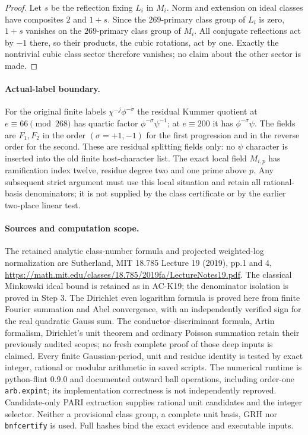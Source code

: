 \begin{proof}
Let $s$ be the reflection fixing $L_i$ in $M_i$.
Norm and extension on ideal classes have composites $2$ and $1+s$.
Since the $269$-primary class group of $L_i$ is zero, $1+s$ vanishes
on the $269$-primary class group of $M_i$.
All conjugate reflections act by $-1$ there, so their products,
the cubic rotations, act by one.
Exactly the nontrivial cubic class sector therefore vanishes;
no claim about the other sector is made.
\end{proof}

\paragraph{Actual-label boundary.}
For the original finite labels $\chi^{-j}\phi^{-\sigma}$ the residual
Kummer quotient at $e\equiv66\pmod{268}$ has quartic factor
$\phi^{-\sigma}\psi^{-1}$; at $e\equiv200$ it has
$\phi^{-\sigma}\psi$.
The fields are $F_1,F_2$ in the order $(\sigma=+1,-1)$ for the
first progression and in the reverse order for the second.
These are residual splitting fields only: no $\psi$ character is
inserted into the old finite host-character list.
The exact local field $M_{i,p}$ has ramification index twelve,
residue degree two and one prime above $p$.
Any subsequent strict argument must use this local situation and
retain all rational-basis denominators; it is not supplied by the
class certificate or by the earlier two-place linear test.

\paragraph{Sources and computation scope.}
The retained analytic class-number formula and projected weighted-log
normalization are Sutherland, MIT 18.785 Lecture 19 (2019), pp.1 and 4,
\url{https://math.mit.edu/classes/18.785/2019fa/LectureNotes19.pdf}.
The classical Minkowski ideal bound is retained as in AC-K19;
the denominator isolation is proved in Step 3.
The Dirichlet even logarithm formula is proved here from finite
Fourier summation and Abel convergence, with an independently
verified sign for the real quadratic Gauss sum.
The conductor--discriminant formula, Artin formalism, Dirichlet's
unit theorem and ordinary Poisson summation retain their previously
audited scopes; no fresh complete proof of those deep inputs is claimed.
Every finite Gaussian-period, unit and residue identity is tested
by exact integer, rational or modular arithmetic in saved scripts.
The numerical runtime is python-flint 0.9.0 and documented outward
ball operations, including order-one \texttt{arb.expint}; its
implementation correctness is not independently reproved.
Candidate-only PARI extraction supplies rational unit candidates
and the integer selector.  Neither a provisional class group,
a complete unit basis, GRH nor \texttt{bnfcertify} is used.
Full hashes bind the exact evidence and executable inputs.

